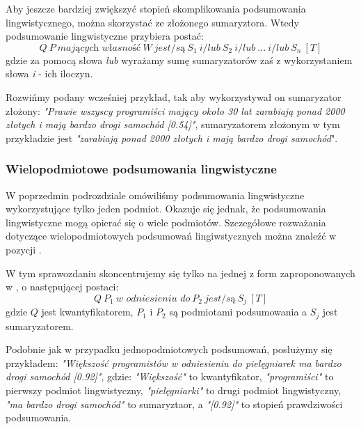 \documentclass{classrep}
\begin{document}
Aby jeszcze bardziej zwiększyć stopień skomplikowania podsumowania lingwistycznego, można skorzystać ze złożonego sumaryztora. Wtedy podsumowanie lingwistyczne przybiera postać:
\begin{equation}
Q  ~ P ~ \textit{mających własność} ~ W ~ { \textit{jest/są} }  ~ S_1 ~ \textit{i/lub} ~ S_2  ~ \textit{i/lub} ~ ... ~ \textit{i/lub} ~ S_n ~[T]
\end{equation}
gdzie za pomocą słowa \textit{lub} wyrażamy sumę sumaryzatorów zaś z wykorzystaniem słowa \textit{i} - ich iloczyn.\newline

Rozwińmy podany wcześniej przykład, tak aby wykorzystywał on sumaryzator złożony: \textit{"Prawie wszyscy programiści mający około 30 lat zarabiają ponad 2000 złotych i mają bardzo drogi samochód [0.54]"}, sumaryzatorem złożonym w tym przykładzie jest \textit{"zarabiają ponad 2000 złotych i mają bardzo drogi samochód}".\newline


\subsubsection{Wielopodmiotowe podsumowania lingwistyczne}
W poprzedmin podrozdziale omówiliśmy podsumowania lingwistyczne wykorzystujące tylko jeden podmiot. Okazuje się jednak, że podsumowania lingwistyczne mogą opierać się o wiele podmiotów. Szczegółowe rozważania dotyczące wielopodmiotowych podsumowań lingiwstycznych można znaleźć w pozycji \cite{polska}. \newline

W tym sprawozdaniu skoncentrujemy się tylko na jednej z form zaproponowanych w \cite{polska}, o następującej postaci:
\begin{equation}
Q  ~ P_1 ~ \textit{w odniesieniu do} ~ P_2  ~ { \textit{jest/są} }  ~ S_j ~[T]
\end{equation}
gdzie $Q$ jest kwantyfikatorem, $P_1$ i $P_2$ są podmiotami podsumowania a $S_j$ jest sumaryzatorem.\newline

Podobnie jak w przypadku jednopodmiotowych podsumowań, posłużymy się przykładem: \textit{"Większość programistów w odniesieniu do pielęgniarek ma bardzo drogi samochód [0.92]"}, gdzie: \textit{"Większość"} to kwantyfikator, \textit{"programiści"} to pierwszy podmiot lingwistyczny,  \textit{"pielęgniarki"} to drugi podmiot lingwistyczny, \textit{"ma bardzo drogi samochód"} to sumaryztaor, a  \textit{"[0.92]"} to stopień prawdziwości podsumowania.
\end{document}
